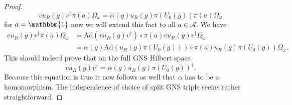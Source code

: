 \documentclass[12pt,a4paper,twoside]{article}
\renewcommand{\AA}{\mathcal A}
\newcommand{\one}{\mathbbm{1}}
\newcommand{\Ad}{\textrm{Ad}}
\theoremstyle{definition}
\newtheorem{lemma}[theorem]{Lemma}
\numberwithin{equation}{section}
\begin{document}
\begin{proof}
 	\begin{equation}
 		v u_R(g) v^\dagger \pi(a) \Omega_\omega =\alpha(g) u_R(g) \pi(U_0(g))\pi(a) \Omega_\omega
 	\end{equation}
 	for $a=\one$ now we will extend this fact to all $a\in\AA$. We have
 	\begin{align}
 		v u_R(g) v^\dagger \pi(a) \Omega_\omega&=\Ad(v u_R(g) v^\dagger)\circ \pi(a) v u_R(g) v^\dagger \Omega_\omega\\
 		&=\alpha(g) \Ad(u_R(g) \pi(U_0(g)))\circ \pi(a) u_R(g) \pi(U_0(g)) \Omega_\omega.
 	\end{align}
 	This should indeed prove that on the full GNS Hilbert space
 	\begin{equation}
 		v u_R(g)v^\dagger =\alpha(g) u_R(g)\pi(U_0(g))^\dagger.
 	\end{equation}
 	Because this equation is true it now follows as well that $\alpha$ has to be a homomorphism. The independence of choice of split GNS triple seems rather straightforward.
\end{proof}
{}

\end{document}
